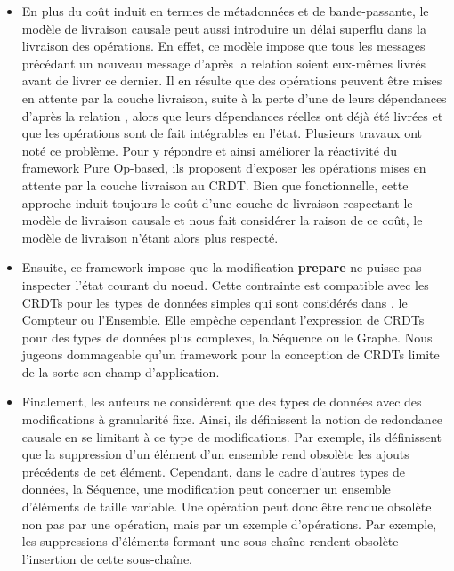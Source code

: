 \begin{itemize}
    \item En plus du coût induit en termes de métadonnées et de bande-passante, le modèle de livraison causale peut aussi introduire un délai superflu dans la livraison des opérations.
        En effet, ce modèle impose que tous les messages précédant un nouveau message d'après la relation \hb soient eux-mêmes livrés avant de livrer ce dernier.
        Il en résulte que des opérations peuvent être mises en attente par la couche livraison, \eg suite à la perte d'une de leurs dépendances d'après la relation \hb, alors que leurs dépendances réelles ont déjà été livrées et que les opérations sont de fait intégrables en l'état.
        Plusieurs travaux \cite{2020-flec-bauwens,2021-improving-reactivity-pure-op-based-crdts-bauwens} ont noté ce problème.
        Pour y répondre et ainsi améliorer la réactivité du framework Pure Op-based, ils proposent d'exposer les opérations mises en attente par la couche livraison au \ac{CRDT}.
        Bien que fonctionnelle, cette approche induit toujours le coût d'une couche de livraison respectant le modèle de livraison causale et nous fait considérer la raison de ce coût, le modèle de livraison n'étant alors plus respecté.
    \item Ensuite, ce framework impose que la modification \textbf{prepare} ne puisse pas inspecter l'état courant du noeud.
        Cette contrainte est compatible avec les \acp{CRDT} pour les types de données simples qui sont considérés dans \cite{baquero2017pure}, \eg le Compteur ou l'Ensemble.
        Elle empêche cependant l'expression de \acp{CRDT} pour des types de données plus complexes, \eg la Séquence ou le Graphe.
        Nous jugeons dommageable qu'un framework pour la conception de \acp{CRDT} limite de la sorte son champ d'application.
    \item Finalement, les auteurs ne considèrent que des types de données avec des modifications à granularité fixe.
        Ainsi, ils définissent la notion de redondance causale en se limitant à ce type de modifications.
        Par exemple, ils définissent que la suppression d'un élément d'un ensemble rend obsolète les ajouts précédents de cet élément.
        Cependant, dans le cadre d'autres types de données, \eg la Séquence, une modification peut concerner un ensemble d'éléments de taille variable.
        Une opération peut donc être rendue obsolète non pas par une opération, mais par un exemple d'opérations.
        Par exemple, les suppressions d'éléments formant une sous-chaîne rendent obsolète l'insertion de cette sous-chaîne.

\end{itemize}
